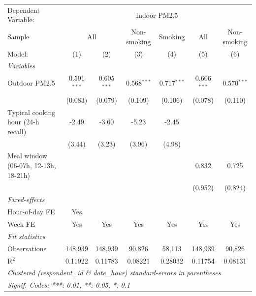 
\begingroup
\centering
\begin{tabular}{lcccccc}
   \tabularnewline \midrule \midrule
   Dependent Variable: & \multicolumn{6}{c}{Indoor PM2.5}\\
   Sample & \multicolumn{2}{c}{All} & Non-smoking & Smoking & All & Non-smoking \\ 
   Model:                               & (1)           & (2)           & (3)           & (4)           & (5)           & (6)\\  
   \midrule
   \emph{Variables}\\
   Outdoor PM2.5                        & 0.591$^{***}$ & 0.605$^{***}$ & 0.568$^{***}$ & 0.717$^{***}$ & 0.606$^{***}$ & 0.570$^{***}$\\   
                                        & (0.083)       & (0.079)       & (0.109)       & (0.106)       & (0.078)       & (0.110)\\   
   Typical cooking hour (24-h recall)   & -2.49         & -3.60         & -5.23         & -2.45         &               &   \\   
                                        & (3.44)        & (3.23)        & (3.96)        & (4.98)        &               &   \\   
   Meal window (06-07h, 12-13h, 18-21h) &               &               &               &               & 0.832         & 0.725\\   
                                        &               &               &               &               & (0.952)       & (0.824)\\   
   \midrule
   \emph{Fixed-effects}\\
   Hour-of-day FE                       & Yes           &               &               &               &               & \\  
   Week FE                              & Yes           & Yes           & Yes           & Yes           & Yes           & Yes\\  
   \midrule
   \emph{Fit statistics}\\
   Observations                         & 148,939       & 148,939       & 90,826        & 58,113        & 148,939       & 90,826\\  
   R$^2$                                & 0.11922       & 0.11783       & 0.08221       & 0.28032       & 0.11754       & 0.08131\\  
   \midrule \midrule
   \multicolumn{7}{l}{\emph{Clustered (respondent\_id \& date\_hour) standard-errors in parentheses}}\\
   \multicolumn{7}{l}{\emph{Signif. Codes: ***: 0.01, **: 0.05, *: 0.1}}\\
\end{tabular}
\par\endgroup



